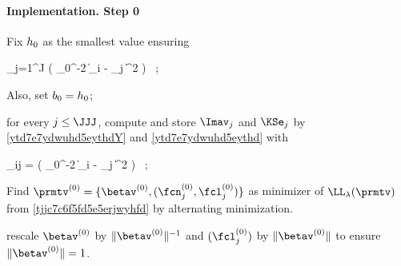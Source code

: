 \paragraph{Implementation. Step 0}
Fix \( h_{0} \) as the smallest value ensuring
\begin{EQA}[c]
	\sum_{j=1}^{J} 
	\sumi \Kern\bigl( \hiso_{0}^{-2} \| \Xv_{i} - \xv_{j} \|^{2} \bigr)
	\geq 
	\nmin
	\, ;
\end{EQA}
Also, set \( b_{0} = h_{0} \);
\begin{mylist}

\item 
for every \( j \leq \JJJ \), compute and store \( \Imav_{j} \) and \( \KSe_{j} \) by \eqref{ytd7e7ydwuhd5eythdY} and \eqref{ytd7e7ydwuhd5eythd}
with 
\begin{EQA}[c]
	\weight_{ij} = \Kern\bigl( \hiso_{0}^{-2} \| \Xv_{i} - \xv_{j} \|^{2} \bigr) 
	\, ;
\end{EQA}
\item 
Find \( \prmtv^{(0)} = \{ \betav^{(0)},(\fcn_{j}^{(0)},\fcl_{j}^{(0)}) \} \) as minimizer of 
\( \LL_{\lambda}(\prmtv) \) from \eqref{tjjc7c6f5fd5e5erjwyhfd} by alternating minimization.
\item 
rescale \( \betav^{(0)} \) by \( \| \betav^{(0)} \|^{-1} \) and \( (\fcl_{j}^{(0)}) \) by \( \| \betav^{(0)} \| \) to ensure 
\( \| \betav^{(0)} \| = 1 \).
\end{mylist}

